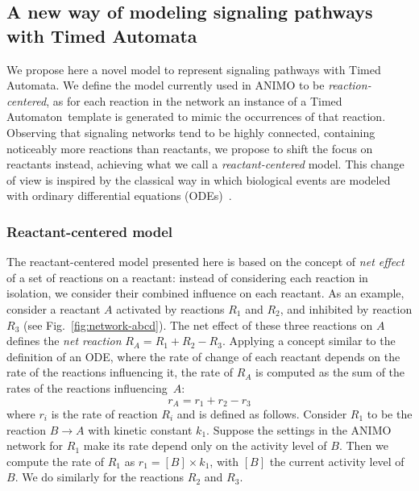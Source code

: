\documentclass{bmcart}
\def\ta{Timed Automaton}
\def\tas{Timed Automata}
\begin{document}
\subsection*{A new way of modeling signaling pathways with \tas}\label{sec:animo-new}
We propose here a novel model to represent signaling pathways with \tas.
We define the model currently used in ANIMO to be \emph{reaction-centered}, as for each reaction
in the network an instance of a \ta\ template is generated to mimic
the occurrences of that reaction. Observing that signaling
networks tend to be highly connected, containing noticeably more reactions than reactants,
we propose to shift the focus on reactants instead, achieving what we call a \emph{reactant-centered} model.
This change of view is inspired by the classical way in which biological events are modeled
with ordinary differential equations (ODEs)~\cite{ode-ma-anche-altro}.




\subsubsection*{Reactant-centered model}\label{sec:reactant-centered}
The reactant-centered model presented here is based on the concept of \emph{net effect} of a set of reactions on a reactant:
instead of considering each reaction in isolation, we consider their combined influence on each reactant.
As an example, consider a reactant $A$ activated by reactions $R_1$ and $R_2$, and inhibited
by reaction $R_3$ (see Fig.~\ref{fig:network-abcd}).
The net effect of these three reactions on $A$ defines the \emph{net reaction} $R_A = R_1 + R_2 - R_3.$
Applying a concept similar to the definition of an ODE,
where the rate of change of each reactant depends on the rate of the reactions influencing it,
the rate of $R_A$ is computed as the sum of the rates of the reactions influencing~$A$: 
$$r_A = r_1 + r_2 - r_3$$
where $r_i$ is the rate of reaction $R_i$ and is defined as follows.
Consider $R_1$ to be the reaction $B \rightarrow A$ with kinetic constant $k_1$.
Suppose the settings in the ANIMO network for $R_1$ make its rate depend only on the
activity level of $B$. Then we compute the rate of $R_1$ as $r_1 = [B] \times k_1$, with
$[B]$ the current activity level of $B$. We do similarly for the reactions $R_2$ and $R_3$.
\end{document}
